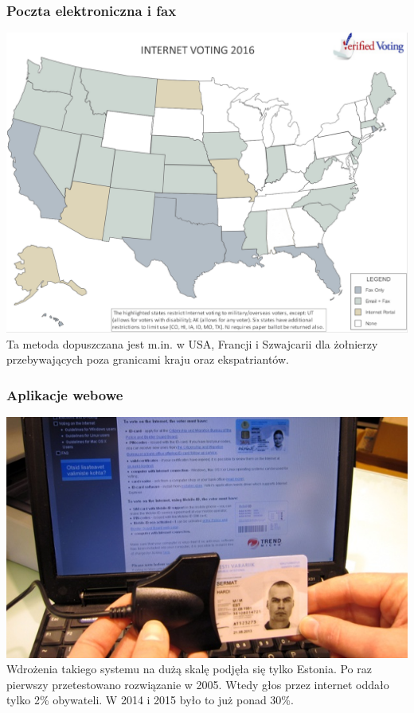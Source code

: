 \documentclass{beamer}
\begin{document}
\begin{frame}
\frametitle{Poczta elektroniczna i fax}
\includegraphics[height=0.65\paperheight, center]{email} \\ 
Ta metoda dopuszczana jest m.in. w USA, Francji i Szwajcarii dla żołnierzy przebywających poza granicami kraju oraz ekspatriantów.
\end{frame}

\begin{frame}
\frametitle{Aplikacje webowe}
\includegraphics[height=0.6\paperheight, center]{estonia} \\ \pause
Wdrożenia takiego systemu na dużą skalę podjęła się tylko Estonia. \pause Po raz pierwszy przetestowano rozwiązanie w 2005. Wtedy głos przez internet oddało tylko 2\% obywateli. \pause W 2014 i 2015 było to już ponad 30\%.
\end{frame}
\end{document}
